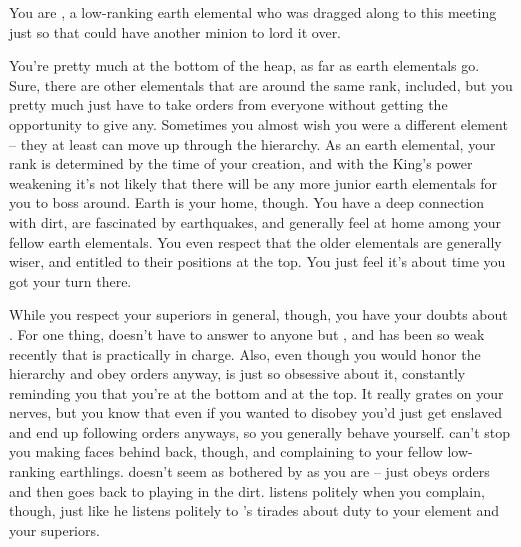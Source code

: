 \documentclass[char]{elementals}
\begin{document}
\name{\cMiniEarth{}}

You are \cMiniEarth{\intro}, a low-ranking earth elemental who was dragged along to this meeting just so that \cLoyal{\intro} could have another minion to lord it over.

You're pretty much at the bottom of the heap, as far as earth elementals go.  Sure, there are other elementals that are around the same rank, \cMinion{\intro} included, but you pretty much just have to take orders from everyone without getting the opportunity to give any.  Sometimes you almost wish you were a different element -- they at least can move up through the hierarchy.  As an earth elemental, your rank is determined by the time of your creation, and with the King's power weakening it's not likely that there will be any more junior earth elementals for you to boss around.  Earth is your home, though.  You have a deep connection with dirt, are fascinated by earthquakes, and generally feel at home among your fellow earth elementals.  You even respect that the older elementals are generally wiser, and entitled to their positions at the top.  You just feel it's about time you got your turn there.

While you respect your superiors in general, though, you have your doubts about \cLoyal{}.  For one thing, \cLoyal{\they} doesn't have to answer to anyone but \cEarthKing{}, and \cEarthKing{\they} has been so weak recently that \cLoyal{} is practically in charge.  Also, even though you would honor the hierarchy and obey orders anyway, \cLoyal{\they} is just so obsessive about it, constantly reminding you that you're at the bottom and  at the top.  It really grates on your nerves, but you know that even if you wanted to disobey you'd just get enslaved and end up following orders anyways, so you generally behave yourself.  \cLoyal{} can't stop you making faces behind \cLoyal{\their} back, though, and complaining to your fellow low-ranking earthlings.  \cMinion{} doesn't seem as bothered by \cLoyal{} as you are -- \cMinion{\they} just obeys orders and then goes back to playing in the dirt.  \cMinion{\They} listens politely when you complain, though, just like he listens politely to \cLoyal{}'s tirades about duty to your element and your superiors.
\end{document}
